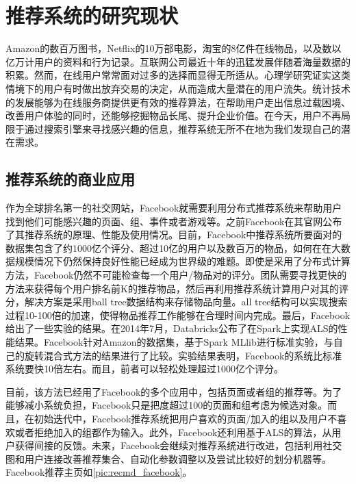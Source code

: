 	\section{推荐系统的研究现状}
	Amazon的数百万图书，Netflix的10万部电影，淘宝的8亿件在线物品，以及数以亿万计用户的资料和行为记录。互联网公司最近十年的迅猛发展伴随着海量数据的积累。然而，在线用户常常面对过多的选择而显得无所适从。心理学研究证实这类情境下的用户有时做出放弃交易的决定，从而造成大量潜在的用户流失。统计技术的发展能够为在线服务商提供更有效的推荐算法，在帮助用户走出信息过载困境、改善用户体验的同时，还能够挖掘物品长尾、提升企业价值。在今天，用户不再局限于通过搜索引擎来寻找感兴趣的信息，推荐系统无所不在地为我们发现自己的潜在需求。
		\subsection{推荐系统的商业应用}
		作为全球排名第一的社交网站，Facebook就需要利用分布式推荐系统来帮助用户找到他们可能感兴趣的页面、组、事件或者游戏等。之前Facebook在其官网公布了其推荐系统的原理、性能及使用情况\citep{recmd-facebook}。目前，Facebook中推荐系统所要面对的数据集包含了约1000亿个评分、超过10亿的用户以及数百万的物品，如何在在大数据规模情况下仍然保持良好性能已经成为世界级的难题。即使是采用了分布式计算方法，Facebook仍然不可能检查每一个用户/物品对的评分。团队需要寻找更快的方法来获得每个用户排名前K的推荐物品，然后再利用推荐系统计算用户对其的评分，解决方案是采用ball tree数据结构来存储物品向量。all tree结构可以实现搜索过程10-100倍的加速，使得物品推荐工作能够在合理时间内完成。最后，Facebook给出了一些实验的结果。在2014年7月，Databricks公布了在Spark上实现ALS的性能结果。Facebook针对Amazon的数据集，基于Spark MLlib进行标准实验，与自己的旋转混合式方法的结果进行了比较。实验结果表明，Facebook的系统比标准系统要快10倍左右。而且，前者可以轻松处理超过1000亿个评分。

		目前，该方法已经用了Facebook的多个应用中，包括页面或者组的推荐等。为了能够减小系统负担，Facebook只是把度超过100的页面和组考虑为候选对象。而且，在初始迭代中，Facebook推荐系统把用户喜欢的页面/加入的组以及用户不喜欢或者拒绝加入的组都作为输入。此外，Facebook还利用基于ALS的算法，从用户获得间接的反馈。未来，Facebook会继续对推荐系统进行改进，包括利用社交图和用户连接改善推荐集合、自动化参数调整以及尝试比较好的划分机器等。Facebook推荐主页如\autoref{pic:recmd_facebook}。
		\begin{figure}
	    \centering
	      \label{pic:recmd_facebook}
	    \end{figure}

